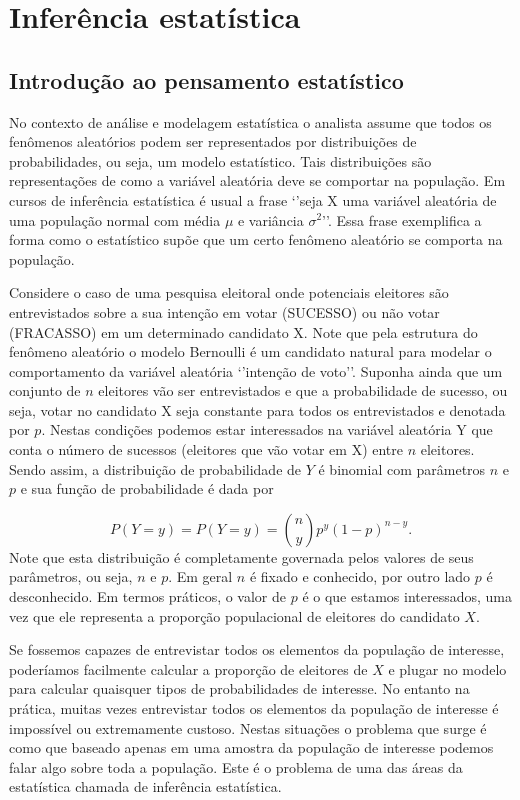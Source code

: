\documentclass[
  10pt,
  a4paper]{book}
\begin{document}
\hypertarget{inferuxeancia-estatuxedstica}{%
\chapter{Inferência estatística}\label{inferuxeancia-estatuxedstica}}

\hypertarget{introduuxe7uxe3o-ao-pensamento-estatuxedstico}{%
\section{Introdução ao pensamento estatístico}\label{introduuxe7uxe3o-ao-pensamento-estatuxedstico}}

No contexto de análise e modelagem estatística o analista assume que todos os fenômenos aleatórios podem ser representados por distribuições de probabilidades, ou seja, um modelo estatístico. Tais distribuições são representações de como a variável aleatória deve se comportar na população. Em cursos de inferência estatística é usual a frase `'seja X uma variável aleatória de uma população normal com média \(\mu\) e variância \(\sigma^2\)''.
Essa frase exemplifica a forma como o estatístico supõe que um certo fenômeno aleatório se comporta na população.

Considere o caso de uma pesquisa eleitoral onde potenciais eleitores são entrevistados sobre a sua intenção em votar (SUCESSO) ou não votar (FRACASSO) em um determinado candidato X. Note que pela estrutura do fenômeno aleatório o modelo Bernoulli é um candidato natural para modelar o comportamento da variável aleatória `'intenção de voto''.
Suponha ainda que um conjunto de \(n\) eleitores vão ser entrevistados e que a probabilidade de sucesso, ou seja, votar no candidato X seja constante para todos os entrevistados e denotada por \(p.\) Nestas condições podemos estar interessados na variável aleatória Y que conta o número de sucessos (eleitores que vão votar em X) entre \(n\) eleitores. Sendo assim, a distribuição de probabilidade de \(Y\) é binomial com parâmetros \(n\) e \(p\) e sua função de probabilidade é dada por

\[
P(Y = y) = P(Y = y) = \binom{n}{y} p^y (1-p)^{n-y}.
\]
Note que esta distribuição é completamente governada pelos valores de seus parâmetros, ou seja, \(n\) e \(p\). Em geral \(n\) é fixado e conhecido, por outro lado \(p\) é desconhecido. Em termos práticos, o valor de \(p\) é o que estamos interessados, uma vez que ele representa a proporção populacional de eleitores do candidato \(X\).

Se fossemos capazes de entrevistar todos os elementos da população de interesse, poderíamos facilmente calcular a proporção de eleitores de \(X\) e plugar no modelo para calcular quaisquer tipos de probabilidades de interesse. No entanto na prática, muitas vezes entrevistar todos os elementos da população de interesse é impossível ou extremamente custoso. Nestas situações o problema que surge é como que baseado apenas em uma amostra da população de interesse podemos falar algo sobre toda a população. Este é o problema de uma das áreas da estatística chamada de inferência estatística.
\end{document}
